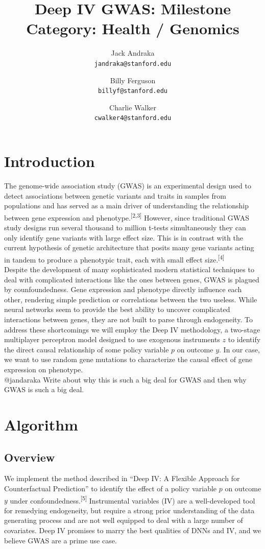 \documentclass[11pt, oneside, twocolumn]{article}   	%
\title{Deep IV GWAS: Milestone \\
	\large Category: Health / Genomics}
\author{
	Jack Andraka\\ 
	\texttt{jandraka@stanford.edu}
	\and
	Billy Ferguson\\
	\texttt{billyf@stanford.edu}
	\and
	Charlie Walker\\
	\texttt{cwalker4@stanford.edu}
}
\date{}							%
\begin{document}
\maketitle
\section{Introduction}
 The genome-wide association study (GWAS) is an experimental design used to detect associations between genetic variants and traits in samples from populations and has served as a main driver of understanding the relationship between gene expression and phenotype.\textsuperscript{[2,3]} However, since traditional GWAS study designs run several thousand to million t-tests simultaneously they can only identify gene variants with large effect size. This is in contrast with the current hypothesis of genetic architecture that posits many gene variants acting in tandem to produce a phenotypic trait, each with small effect size.\textsuperscript{[4]} \\
 
 Despite the development of many sophisticated modern statistical techniques to deal with complicated interactions like the ones between genes, GWAS is plagued by counfoundedness. Gene expression and phenotype directly influence each other, rendering simple prediction or correlations between the two useless. While neural networks seem to provide the best ability to uncover complicated interactions between genes, they are not built to parse through endogeneity.  To address these shortcomings we will employ the Deep IV methodology, a two-stage multiplayer perceptron model designed to use exogenous instruments $z$ to identify the direct causal relationship of some policy variable $p$ on outcome $y$. In our case, we want to use random gene mutations to characterize the causal effect of gene expression on phenotype.\\
 
 @jandaraka Write about why this is such a big deal for GWAS and then why GWAS is such a big deal. 

\section{Algorithm}
\subsection{Overview}
We implement the method described in ``Deep IV: A Flexible Approach for Counterfactual Prediction'' to identify the effect of a policy variable $p$ on outcome $y$ under confoundedness.\textsuperscript{[5]} Instrumental variables (IV) are a well-developed tool for remedying endogeneity, but require a strong prior understanding of the data generating process and are not well equipped to deal with a large number of covariates. Deep IV promises to marry the best qualities of DNNs and IV, and we believe GWAS are a prime use case. \\
\end{document}
